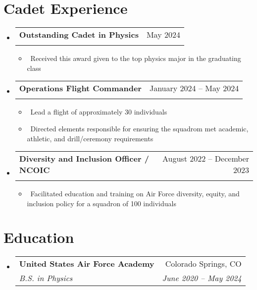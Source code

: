 \documentclass[letterpaper,10pt]{article}
\makeatletter
\newcommand{\resumeItem}[1]{\item\small{#1}}
\newcommand{\resumeSubheading}[4]{
\vspace{-1pt}\item
  \begin{tabular*}{0.97\textwidth}[t]{l@{\extracolsep{\fill}}r}
    \textbf{#1} & #2 \\
    \textit{#3} & \textit{#4} \\
  \end{tabular*}\vspace{-7pt}
}
\newcommand{\resumeSubHeadingList}{\begin{itemize}[leftmargin=0.15in, label={}]}
\newcommand{\resumeSubHeadingListEnd}{\end{itemize}}
\makeatother
\begin{document}
\section{Cadet Experience}
\resumeSubHeadingList
	\resumeSubheading{Outstanding Cadet in Physics}{May 2024}{}{}
	\resumeSubHeadingList
		\resumeItem{\textbullet\ Received this award given to the top physics major in the graduating class}
	\resumeSubHeadingListEnd
	\resumeSubheading{Operations Flight Commander}{January 2024 -- May 2024}{}{}
	\resumeSubHeadingList
		\resumeItem{\textbullet\ Lead a flight of approximately 30 individuals} 
		\resumeItem{\textbullet\ Directed elements responsible for ensuring the squadrom met academic, athletic, and drill/ceremony requirements}
	\resumeSubHeadingListEnd
	\resumeSubheading{Diversity and Inclusion Officer / NCOIC}{August 2022 -- December 2023}{}{}
	\resumeSubHeadingList
		\resumeItem{\textbullet\ Facilitated education and training on Air Force diversity, equity, and inclusion policy for a squadron of 100 individuals}
	\resumeSubHeadingListEnd
\resumeSubHeadingListEnd

\section{Education}
\resumeSubHeadingList
  \resumeSubheading
      {United States Air Force Academy}{Colorado Springs, CO}
      {B.S. in Physics}{June 2020 -- May 2024}
\resumeSubHeadingListEnd
\end{document}
